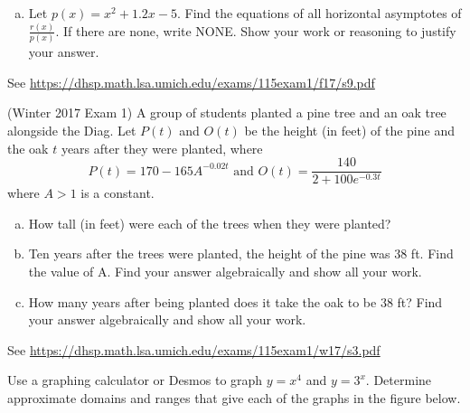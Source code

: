 \documentclass[11pt]{exam}
\begin{document}
\begin{questions}
\begin{enumerate}[(a)]
\item Let $p(x) = x^2 + 1.2x -5$. Find the equations of all horizontal asymptotes of $\frac{r(x)}{p(x)}$. If there are none, write NONE. Show your work or reasoning to justify your answer.
\end{enumerate}
\begin{solution}
  See \href{https://dhsp.math.lsa.umich.edu/exams/115exam1/f17/s9.pdf}{https://dhsp.math.lsa.umich.edu/exams/115exam1/f17/s9.pdf}
\end{solution}
\question (Winter 2017 Exam 1)
A group of students planted a pine tree and an oak tree alongside the Diag. Let $P(t)$ and $O(t)$ be the height (in feet) of the pine and the oak $t$ years after they were planted, where
$$P(t) = 170 - 165 A^{-0.02 t} \textrm{ and } O(t) = \frac{140}{2+100e^{-0.3t}}$$
where $A > 1$ is a constant. 
\begin{enumerate}[(a)]
\item How tall (in feet) were each of the trees when they were planted?
\item Ten years after the trees were planted, the height of the pine was 38 ft. Find the value of A. Find your answer algebraically and show all your work.
\item How many years after being planted does it take the oak to be 38 ft? Find your answer algebraically and show all your work.
\end{enumerate}
\begin{solution}
  See \href{https://dhsp.math.lsa.umich.edu/exams/115exam1/w17/s3.pdf}{https://dhsp.math.lsa.umich.edu/exams/115exam1/w17/s3.pdf} 
\end{solution}
\question Use a graphing calculator or Desmos to graph $y=x^4$ and $y = 3^x$. Determine approximate domains and ranges that give each of the graphs in the figure below.
	\begin{figure}[h]
	\centering

\end{figure}
\end{questions}
\end{document}
